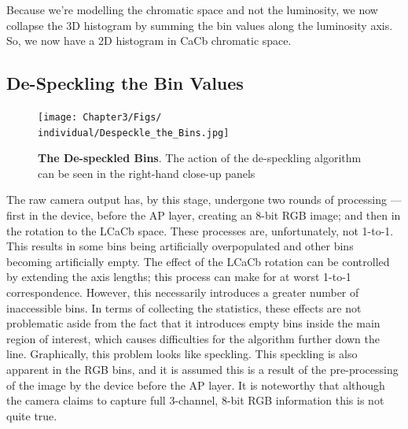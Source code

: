 Because we're modelling the chromatic space and not the luminosity, we now collapse the 3D histogram by summing the bin values along the luminosity axis. So, we now have a 2D histogram in CaCb chromatic space.





\subsection{De-Speckling the Bin Values}\label{sec:DeSpeckle}

\begin{figure}[h!]
  \centering
    \texttt{[image: Chapter3/Figs/\\individual/Despeckle\_the\_Bins.jpg]}
        \caption{\textbf{The De-speckled Bins}. The action of the de-speckling algorithm can be seen in the right-hand close-up panels}  \label{fig:Despeckle_the_Bins}
    \end{figure}
    
The raw camera output has, by this stage, undergone two rounds of processing --- first in the device, before the AP layer, creating an 8-bit RGB image; and then in the rotation to the LCaCb space. These processes are, unfortunately, not 1-to-1. This results in some bins being artificially overpopulated and other bins becoming artificially empty. The effect of the LCaCb rotation can be controlled by extending the axis lengths; this process can make for at worst 1-to-1 correspondence. However, this necessarily introduces a greater number of inaccessible bins. In terms of collecting the statistics, these effects are not problematic aside from the fact that it introduces empty bins inside the main region of interest, which causes difficulties for the algorithm further down the line. Graphically, this problem looks like speckling. This speckling is also apparent in the RGB bins, and it is assumed this is a result of the pre-processing of the image by the device before the AP layer. It is noteworthy that although the camera claims to capture full 3-channel, 8-bit RGB information this is not quite true. 

